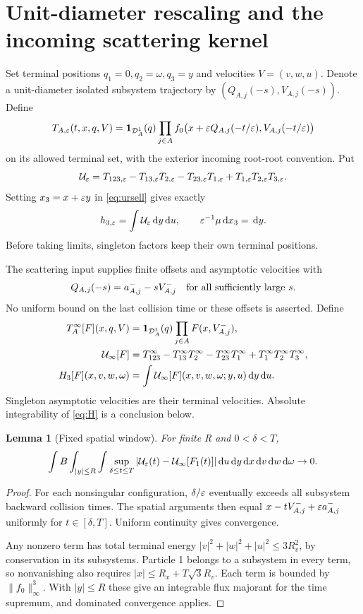 \documentclass[11pt,letterpaper]{article}
\newtheorem{lemma}[theorem]{Lemma}
\theoremstyle{remark}\newtheorem{remark}[theorem]{Remark}
\numberwithin{equation}{section}
\begin{document}
\section{Unit-diameter rescaling and the incoming scattering kernel}\label{sec:kernel}
Set terminal positions $q_1=0,q_2=\omega,q_3=y$ and velocities $V=(v,w,u)$. Denote a unit-diameter isolated subsystem trajectory by $(Q_{A,j}(-s),V_{A,j}(-s))$. Define
\[
 T_{A,\varepsilon}(t,x,q,V)=\mathbf1_{\mathcal D_A^1}(q)
  \prod_{j\in A}f_0\bigl(x+\varepsilon Q_{A,j}(-t/\varepsilon),V_{A,j}(-t/\varepsilon)\bigr)
\]
on its allowed terminal set, with the exterior incoming root-root convention. Put
\begin{equation}\label{eq:Ueps}
 \mathcal U_\varepsilon=T_{123,\varepsilon}-T_{13,\varepsilon}T_{2,\varepsilon}
             -T_{23,\varepsilon}T_{1,\varepsilon}+T_{1,\varepsilon}T_{2,\varepsilon}T_{3,\varepsilon}.
\end{equation}
Setting $x_3=x+\varepsilon y$ in \eqref{eq:ursell} gives exactly
\begin{equation}\label{eq:scaling}
 h_{3,\varepsilon}=\int\mathcal U_\varepsilon\,\mathrm d y\,\mathrm d u,\qquad \varepsilon^{-1}\mu\,\mathrm d x_3=\,\mathrm d y.
\end{equation}
Before taking limits, singleton factors keep their own terminal positions.

The scattering input supplies finite offsets and asymptotic velocities with
\[
 Q_{A,j}(-s)=a_{A,j}^- -sV_{A,j}^-\quad\hbox{for all sufficiently large }s.
\]
No uniform bound on the last collision time or these offsets is asserted. Define
\begin{align}
 T_A^\infty[F](x,q,V)&=\mathbf1_{\mathcal D_A^1}(q)\prod_{j\in A}F(x,V_{A,j}^-),\nonumber\\
 \mathcal U_\infty[F]&=T_{123}^\infty-T_{13}^\infty T_2^\infty
                  -T_{23}^\infty T_1^\infty+T_1^\infty T_2^\infty T_3^\infty,\label{eq:Uinf}\\
 H_3[F](x,v,w,\omega)&=\int\mathcal U_\infty[F](x,v,w,\omega;y,u)\,\mathrm d y\,\mathrm d u.\label{eq:H}
\end{align}
Singleton asymptotic velocities are their terminal velocities. Absolute integrability of \eqref{eq:H} is a conclusion below.

\begin{lemma}[Fixed spatial window]\label{lem:window}
For finite R and $0<\delta<T$,
\[
 \int B\int_{|y|\le R}\int\sup_{\delta\le t\le T}
       |\mathcal U_\varepsilon(t)-\mathcal U_\infty[F_1(t)]|\,\mathrm d u\,\mathrm d y\,\mathrm d x\,\mathrm d v\,\mathrm d w\,\mathrm d\omega\to0.
\]
\end{lemma}
\begin{proof}
For each nonsingular configuration, $\delta/\varepsilon$ eventually exceeds all subsystem backward collision times. The spatial arguments then equal $x-tV_{A,j}^-+\varepsilon a_{A,j}^-$ uniformly for $t\in[\delta,T]$. Uniform continuity gives convergence.

Any nonzero term has total terminal energy $|v|^2+|w|^2+|u|^2\le3R_v^2$, by conservation in its subsystems. Particle 1 belongs to a subsystem in every term, so nonvanishing also requires $|x|\le R_x+T\sqrt3R_v$. Each term is bounded by $\|f_0\|_\infty^3$. With $|y|\le R$ these give an integrable flux majorant for the time supremum, and dominated convergence applies.
\end{proof}
\end{document}
